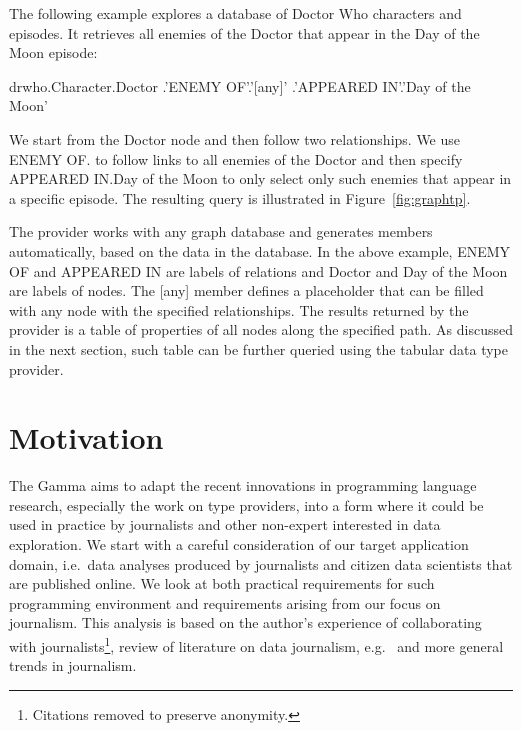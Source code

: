 \documentclass[manuscript,review,anonymous]{acmart}
\newcommand{\ikvd}[1]{{\fontfamily{zi4}\selectfont\small #1}}
\begin{document}
The following example explores a database of Doctor Who characters and episodes. It retrieves
all enemies of the Doctor that appear in the Day of the Moon episode:

\begin{thegamma}
drwho.Character.Doctor
  .'ENEMY OF'.'[any]'
  .'APPEARED IN'.'Day of the Moon'
\end{thegamma}

We start from the \ikvd{Doctor} node and then follow two relationships. We use
\ikvd{\textquotesingle ENEMY OF\textquotesingle.\textquotesingle [any]\textquotesingle}
to follow links to all enemies of the Doctor and then specify
\ikvd{\textquotesingle APPEARED IN\textquotesingle.\textquotesingle Day of the Moon\textquotesingle}
to only select only such enemies that appear in a specific episode. The resulting query
is illustrated in Figure~\ref{fig:graphtp}.

The provider works with any graph database and generates members automatically, based on the
data in the database. In the above example, \ikvd{ENEMY OF} and \ikvd{APPEARED IN} are labels
of relations and \ikvd{Doctor} and \ikvd{Day of the Moon} are labels of nodes. The
\ikvd{[any]} member defines a placeholder that can be filled with any node with the specified
relationships. The results returned by the provider is a table of properties of all nodes
along the specified path. As discussed in the next section, such table can be further queried
using the tabular data type provider.

\newpage

\section{Motivation}
\label{sec:motivation}

The Gamma aims to adapt the recent innovations in programming language research, especially the
work on type providers, into a form where it could be used in practice by journalists and other
non-expert interested in data exploration. We start with a careful consideration of our target
application domain, i.e.~data analyses produced by journalists and citizen data scientists that
are published online. We look at both practical requirements for such programming environment
and requirements arising from our focus on journalism. This analysis is based on the author's
experience of collaborating with journalists\footnote{Citations removed to preserve anonymity.},
review of literature on data journalism, e.g.~\cite{ddj,edcj17,edcj18} and more general trends in
journalism.
\end{document}
